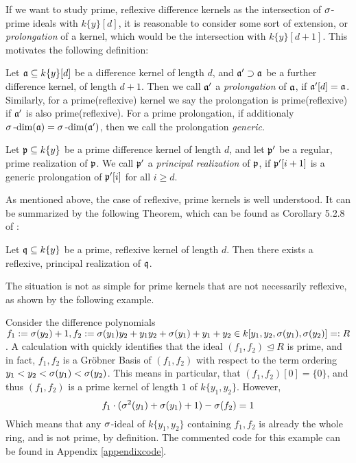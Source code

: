 If we want to study prime, reflexive difference kernels as the intersection of $\sigma$-prime ideals with $k\{y\}[d]$,
it is reasonable to consider some sort of extension, or \emph{prolongation} of a kernel, which would be the intersection with $k\{y\}[d+1]$.  
This motivates the following definition: 

\begin{defn}
Let $\mathfrak{a} \subseteq k\{y\}[d]$ be a difference kernel of length $d$, and $\mathfrak{a}' \supset \mathfrak{a}$ be a further difference kernel, of length $d+1$.
Then we call $\mathfrak{a}'$ a \emph{prolongation} of $\mathfrak{a}$, if $\mathfrak{a}'[d] = \mathfrak{a}$. Similarly, for a prime(reflexive) kernel we say the prolongation is prime(reflexive) if $\mathfrak{a}'$ is also prime(reflexive).
For a prime prolongation, if additionaly $\sigma\operatorname{-dim}(\mathfrak{a}) = \sigma\operatorname{-dim}(\mathfrak{a}')$, then we call the prolongation \emph{generic}.
\end{defn}

\begin{defn}
Let $\mathfrak{p} \subseteq k\{y\}$ be a prime difference kernel of length $d$, and let $\mathfrak{p}'$ be a regular, prime realization of $\mathfrak{p}$. We call $\mathfrak{p}'$ a \emph{principal realization} of $\mathfrak{p}$, if $\mathfrak{p}'[i+1]$ is a generic prolongation of $\mathfrak{p}'[i]$ for all $i \geq d$. 
\end{defn}

As mentioned above, the case of reflexive, prime kernels is well understood. It can be summarized by the following Theorem, which can be found as Corollary 5.2.8 of \cite{wibmer}:
\begin{theorem}\label{reflexiverealization}
Let $\mathfrak{q} \subseteq k\{y\}$ be a prime, reflexive kernel of length $d$. Then there exists a reflexive, principal realization of $\mathfrak{q}$. 
\end{theorem}

The situation is not as simple for prime kernels that are not necessarily reflexive, as shown by the following example.

\begin{ex}\label{counterexker}
Consider the difference polynomials $f_1 := \sigma(y_2) + 1, f_2:= \sigma(y_1)y_2 + y_1y_2 + \sigma(y_1) + y_1 + y_2 \in k[y_1,y_2,\sigma(y_1),\sigma(y_2)] =: R$.
A calculation with \cite{M2} quickly identifies that the ideal $(f_1,f_2) \unlhd R$ is prime, and in fact, $f_1,f_2$ is a Gr\"{o}bner Basis of $(f_1,f_2)$ with respect to the
term ordering $y_1 < y_2 < \sigma(y_1) < \sigma(y_2)$. This means in particular, that $(f_1,f_2)[0] = \{0\}$, and thus $(f_1,f_2)$ is a prime kernel of length $1$ of $k\{y_1,y_2\}$. However,
\[ f_1 \cdot (\sigma^2(y_1) + \sigma(y_1) + 1 ) - \sigma(f_2) = 1 \]
Which means that any $\sigma$-ideal of $k\{y_1,y_2\}$ containing $f_1, f_2$ is already the whole ring, and is not prime, by definition.
The commented code for this example can be found in Appendix \ref{appendixcode}.
\end{ex}

